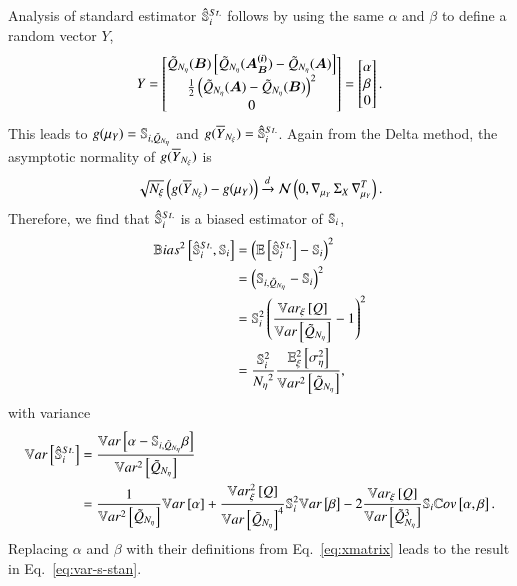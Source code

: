 Analysis of standard estimator $\pollSsalt{i}$ follows by using the same $\alpha$ and $\beta$ to define a random vector $Y$,
\begin{equation*}
    Y = \begin{bmatrix} \Qpoll(\bm{B}) \left[ \Qpoll(\bm{A_B^{(i)}}) - \Qpoll(\bm{A}) \right] \\
                        \frac{1}{2} \left( \Qpoll(\bm{A}) - \Qpoll(\bm{B}) \right)^2 \\
                        0
        \end{bmatrix}
        = \begin{bmatrix} \alpha \\ \beta \\ 0 \end{bmatrix}.
\end{equation*}
This leads to $g(\mu_Y) = \Spoll{i}$ and $g(\yavg) = \pollSsalt{i}$. 
Again from the Delta method, the asymptotic normality of $g(\yavg)$ is
\begin{equation*}
    \sqrt{\Nxi} \left( g(\yavg) - g(\mu_Y) \right) \cond \mathcal{N} \left( 0, \nabla_{\mu_Y} \, \Sigma_X \, \nabla_{\mu_Y}^T \right) .
\end{equation*}
%
Therefore, we find that $\pollSsalt{i}$ is a biased estimator of $\S{i}$,
\begin{align}
    \bias{\pollSsalt{i}, \S{i}} &= \left( \EE{\pollSsalt{i}} - \S{i} \right)^2 \\
    &= \left( \Spoll{i} - \S{i} \right)^2 \\
    &= \S{i}^2 \left( \frac{\Vxi{Q}}{\Var{\Qpoll}} - 1 \right)^2 \\
    &= \frac{\S{i}^2}{\Neta^2} \frac{\EExisq{\Sigsqeta}}{\Vsq{\Qpoll}} ,
\end{align}
with variance
\begin{align}
        \Var{\pollSsalt{i}} &= \frac{\Var{\alpha - \Spoll{i}\beta}}{\Vsq{\Qpoll}} \\
        &= \frac{1}{\Vsq{\Qpoll}}\Var{\alpha} + \frac{\Vxisq{Q}}{\Var{\Qpoll}^4}\S{i}^2 \Var{\beta} - 2 \frac{\Vxi{Q}}{\Var{\Qpoll^3}} \S{i} \Cov{\alpha}{\beta} .
\end{align}
Replacing $\alpha$ and $\beta$ with their definitions from Eq.~\eqref{eq:xmatrix} leads to the result in Eq.~\ref{eq:var-s-stan}.

%
%
%
%

